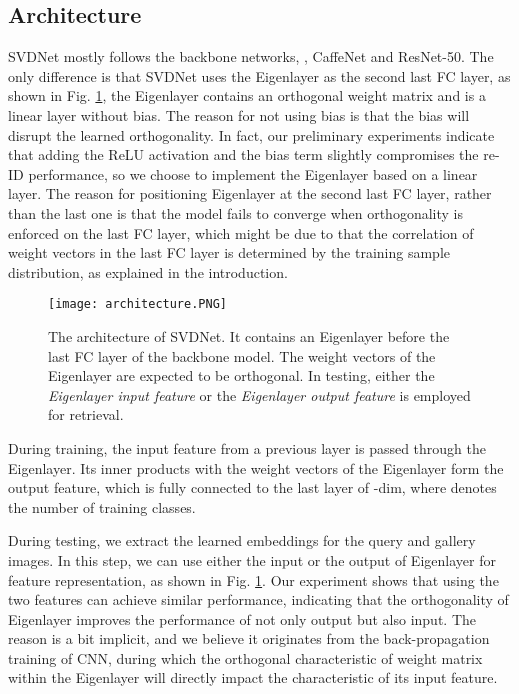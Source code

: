 \documentclass[10pt,twocolumn,letterpaper]{article}
\begin{document}
\subsection{Architecture} \label{sec:architecture}
SVDNet mostly follows the backbone networks, \eg, CaffeNet and ResNet-50. The only difference is that SVDNet uses the Eigenlayer as the second last FC layer, as shown in Fig. \ref{fig:svdnet}, the Eigenlayer contains an orthogonal weight matrix and is a linear layer without bias. The reason for not using bias is that the bias will disrupt the learned orthogonality. In fact, our preliminary experiments indicate that adding the ReLU activation and the bias term slightly compromises the re-ID performance, so we choose to implement the Eigenlayer based on a linear layer. The reason for positioning Eigenlayer at the second last FC layer, rather than the last one is that the model fails to converge when orthogonality is enforced on the last FC layer, which might be due to that the correlation of weight vectors in the last FC layer is determined by the training sample distribution, as explained in the introduction.
\begin{figure}[t]
\begin{center}
\texttt{[image: architecture.PNG]}
\end{center}
\setlength{\abovecaptionskip}{0cm} 
   \caption{The architecture of SVDNet. It contains an Eigenlayer before the last FC layer of the backbone model. The weight vectors of the Eigenlayer are expected to be orthogonal. In testing, either the \emph{Eigenlayer input feature} or the \emph{Eigenlayer output feature} is employed for retrieval.} 
\label{fig:svdnet}
\end{figure}
During training, the input feature from a previous layer is passed through the Eigenlayer. Its inner products with the weight vectors of the Eigenlayer form the output feature, which is fully connected to the last layer of -dim, where  denotes the number of training classes. 

During testing, we extract the learned embeddings for the query and gallery images. In this step, we can use either the input or the output of Eigenlayer for feature representation, as shown in Fig. \ref{fig:svdnet}. Our experiment shows that using the two features can achieve similar performance, indicating that the orthogonality of Eigenlayer improves the performance of not only output but also input. The reason is a bit implicit, and we believe it originates from the back-propagation training of CNN, during which the orthogonal characteristic of weight matrix within the Eigenlayer will directly impact the characteristic of its input feature.  
\end{document}
